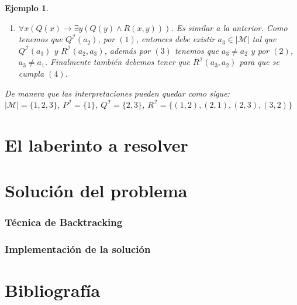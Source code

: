 \documentclass[letterpaper,12pt]{article}
\newtheorem{ejem}{Ejemplo}[]
\begin{document}
\begin{ejem}
\begin{enumerate}
        \item $\forall x (Q(x) \rightarrow \exists y (Q(y) \land R(x,y)))$.
        Es similar a la anterior. Como tenemos que $Q^{\mathcal{I}}(a_{2})$,
        por $(1)$, entonces debe existir $a_{3} \in |\mathcal{M}|$ tal que  
        $Q^{\mathcal{I}}(a_{3})$ y 
        $R^{\mathcal{I}}(a_{2}, a_{3})$, además por $(3)$ tenemos que 
        $a_{3} \neq a_{2}$ y por $(2)$, $a_{3} \neq a_{1}$. Finalmente 
        también debemos tener que $R^{\mathcal{I}}(a_{3}, a_{2})$ para que  
        se cumpla $(4)$. 
      \end{enumerate}

      De manera que las interpretaciones pueden quedar como sigue: \\
      $|\mathcal{M}| = \{1, 2, 3\}$, $P^{\mathcal{I}} = \{1\}$, 
      $Q^{\mathcal{I}} = \{2,3\}$, $R^{\mathcal{I}} = \{(1,2), (2,1),
      (2,3), (3,2)\}$
    \end{ejem}

    \section{El laberinto a resolver}
    \section{Solución del problema}
    \subsubsection{Técnica de Backtracking}
    \subsubsection{Implementación de la solución}
    \section{Bibliografía}
\end{document}
